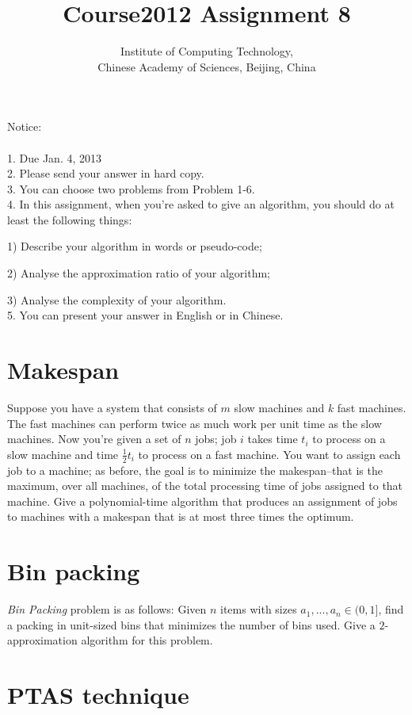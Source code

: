 \documentclass[a4paper,11pt]{article}
\title{Course2012 Assignment 8}
\author{Institute of Computing Technology, \\
                       Chinese Academy of Sciences, Beijing, China }
\begin{document}
\maketitle

Notice:\\\\
1. Due Jan. 4, 2013\\
2. Please send your answer in hard copy.\\
3. You can choose two problems from Problem 1-6.\\
4. In this assignment, when you're asked to give an algorithm, you should do at least the following things:

1) Describe your algorithm in words or pseudo-code;

2) Analyse the approximation ratio of your algorithm;

3) Analyse the complexity of your algorithm.\\
5. You can present your answer in English or in Chinese.

\section{Makespan}

Suppose you have a system that consists of $m$ slow machines and $k$ fast machines. The fast machines can perform twice as much work per unit time as the slow machines. Now you're given a set of $n$ jobs; job $i$ takes time $t_i$ to process on a slow machine and time $\frac{1}{2}t_i$ to process on a fast machine. You want to assign each job to a machine; as before, the goal is to minimize the makespan--that is the maximum, over all machines, of the total processing time of jobs assigned to that machine. Give a polynomial-time algorithm that produces an assignment of jobs to machines with a makespan that is at most three times the optimum.

\section{Bin packing}
\emph{Bin Packing} problem is as follows: Given $n$ items with sizes $a_1,...,a_n\in (0,1]$, find a packing in unit-sized bins that minimizes the number of bins used. Give a $2$-approximation algorithm for this problem.

\section{PTAS technique}
\end{document}
